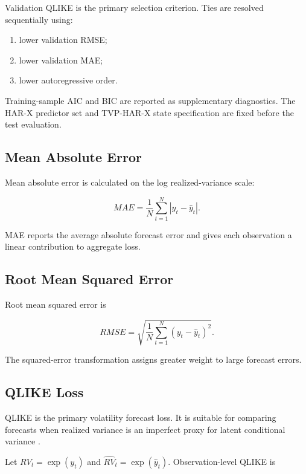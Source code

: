Validation QLIKE is the primary selection criterion. Ties are
resolved sequentially using:

\begin{enumerate}[label=(\roman*)]
    \item lower validation RMSE;
    \item lower validation MAE;
    \item lower autoregressive order.
\end{enumerate}

Training-sample AIC and BIC are reported as supplementary
diagnostics. The HAR-X predictor set and TVP-HAR-X state
specification are fixed before the test evaluation.

\subsection{Mean Absolute Error}

Mean absolute error is calculated on the log
realized-variance scale:

\begin{equation}
MAE
=
\frac{1}{N}
\sum_{t=1}^{N}
\left|
y_t-\widehat{y}_t
\right|.
\label{eq:mae}
\end{equation}

MAE reports the average absolute forecast error and gives each
observation a linear contribution to aggregate loss.

\subsection{Root Mean Squared Error}

Root mean squared error is

\begin{equation}
RMSE
=
\sqrt{
\frac{1}{N}
\sum_{t=1}^{N}
\left(
y_t-\widehat{y}_t
\right)^2
}.
\label{eq:rmse}
\end{equation}

The squared-error transformation assigns greater weight to
large forecast errors.

\subsection{QLIKE Loss}

QLIKE is the primary volatility forecast loss. It is suitable
for comparing forecasts when realized variance is an imperfect
proxy for latent conditional variance
\citep{patton2011}.

Let \(RV_t=\exp(y_t)\) and
\(\widehat{RV}_t=\exp(\widehat{y}_t)\). Observation-level
QLIKE is

